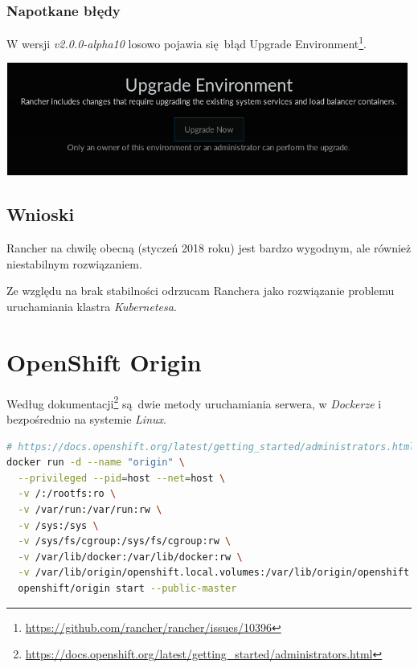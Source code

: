 \documentclass[a4paper,12pt,twoside,openany]{report}
\DeclareRobustCommand{\href}[2]{#2\footnote{\url{#1}}}
\begin{document}
\hypertarget{napotkane-bux142ux119dy}{%
\subsubsection{Napotkane błędy}\label{napotkane-bux142ux119dy}}

W wersji \emph{v2.0.0-alpha10} losowo pojawia się~błąd
\href{https://github.com/rancher/rancher/issues/10396}{Upgrade
Environment}.

\includegraphics[width=5.20833in,height=1.45833in]{assets/rancher2.0-error.png}\\

\hypertarget{wnioski-2}{%
\subsection{Wnioski}\label{wnioski-2}}

Rancher na chwilę obecną (styczeń 2018 roku) jest bardzo wygodnym, ale
również niestabilnym rozwiązaniem.

Ze względu na brak stabilności odrzucam Ranchera jako rozwiązanie
problemu uruchamiania klastra \emph{Kubernetesa}.

\hypertarget{openshift-origin-1}{%
\section{OpenShift Origin}\label{openshift-origin-1}}

Według
\href{https://docs.openshift.org/latest/getting_started/administrators.html}{dokumentacji}
są~dwie metody uruchamiania serwera, w \emph{Dockerze} i bezpośrednio na
systemie \emph{Linux}.

\begin{lstlisting}[language=bash]
# https://docs.openshift.org/latest/getting_started/administrators.html#installation-methods
docker run -d --name "origin" \
  --privileged --pid=host --net=host \
  -v /:/rootfs:ro \
  -v /var/run:/var/run:rw \
  -v /sys:/sys \
  -v /sys/fs/cgroup:/sys/fs/cgroup:rw \
  -v /var/lib/docker:/var/lib/docker:rw \
  -v /var/lib/origin/openshift.local.volumes:/var/lib/origin/openshift.local.volumes:rslave \
  openshift/origin start --public-master
\end{lstlisting}
\end{document}
